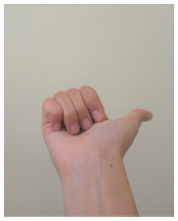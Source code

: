 \documentclass[conference]{IEEEtran}
\begin{document}
\begin{figure} [h]
\begin{center}
\begin{subfigure}[t]{0.11\textwidth}
			\includegraphics[width=\textwidth]{img/pola5b.jpg}
			\caption{\label{fig:gs5b}}
		\end{subfigure}
		\hspace{0.1em}
		\begin{subfigure}[t]{0.11\textwidth}
			\centering

\end{subfigure}
\end{center}
\end{figure}
\end{document}

